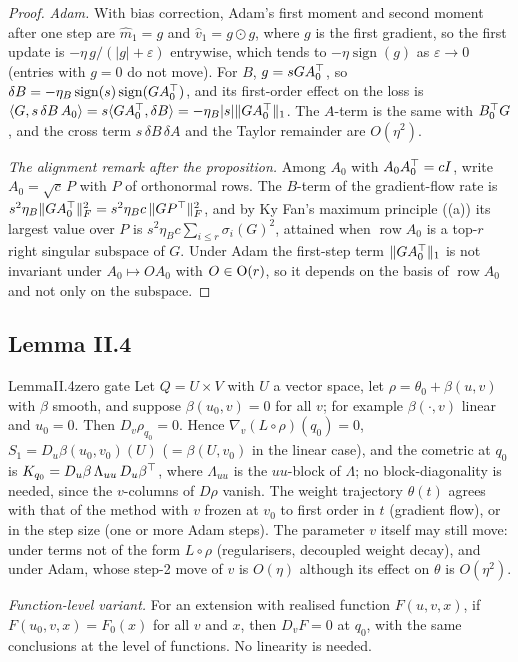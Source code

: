 \begin{proof}
\emph{Adam.} With bias correction, Adam's first moment and second moment after one step are $\hat m_1=g$ and
$\hat v_1=g\odot g$, where $g$ is the first gradient, so the first update is $-\eta\,g/(\lvert g\rvert+\varepsilon)$
entrywise, which tends to $-\eta\operatorname{sign}(g)$ as $\varepsilon\to0$ (entries with $g=0$ do not move). For $B$,
$g=sGA_0^{\top}$, so $\delta B=-\eta_B\operatorname{sign}(s)\operatorname{sign}(GA_0^{\top})$, and its first-order effect on the loss is
$\langle G,s\,\delta B\,A_0\rangle=s\langle GA_0^{\top},\delta B\rangle=-\eta_B\lvert s\rvert\|GA_0^{\top}\|_1$. The $A$-term is the same
with $B_0^{\top} G$, and the cross term $s\,\delta B\,\delta A$ and the Taylor remainder are $O(\eta^2)$.

\emph{The alignment remark after the proposition.} Among $A_0$ with $A_0A_0^{\top}=cI$, write $A_0=\sqrt c\,P$ with $P$ of
orthonormal rows. The $B$-term of the gradient-flow rate is $s^2\eta_B\|GA_0^{\top}\|_F^2=s^2\eta_Bc\,\|GP^{\top}\|_F^2$, and by Ky Fan's
maximum principle ((a)) its largest value over $P$ is $s^2\eta_Bc\sum_{i\le r}\sigma_i(G)^2$, attained when
$\operatorname{row}A_0$ is a top-$r$ right singular subspace of $G$. Under Adam the first-step term
$\|GA_0^{\top}\|_1$ is not invariant under $A_0\mapsto OA_0$ with $O\in\mathrm{O}(r)$, so it depends on the basis of
$\operatorname{row}A_0$ and not only on the subspace.
\end{proof}

\subsection{Lemma II.4}\label{proof:II.4}

\begin{restate}{Lemma}{II.4}{zero gate}
Let $Q=U\times V$ with $U$ a vector space, let $\rho=\theta_0+\beta(u,v)$ with $\beta$ smooth, and suppose
$\beta(u_0,v)=0$ for all $v$; for example $\beta(\cdot,v)$ linear and $u_0=0$. Then $D_v\rho_{q_0}=0$. Hence
$\nabla_v(L\circ\rho)(q_0)=0$, $S_1=D_u\beta(u_0,v_0)(U)$ ($=\beta(U,v_0)$ in the linear case), and the cometric at
$q_0$ is $K_{q_0}=D_u\beta\,\Lambda_{uu}\,D_u\beta^{\top}$, where $\Lambda_{uu}$ is the $uu$-block of $\Lambda$; no
block-diagonality is needed, since the $v$-columns of $D\rho$ vanish. The weight trajectory $\theta(t)$ agrees with that
of the method with $v$ frozen at $v_0$ to first order in $t$ (gradient flow), or in the step size (one or more Adam
steps). The parameter $v$ itself may still move: under terms not of the form $L\circ\rho$ (regularisers, decoupled weight
decay), and under Adam, whose step-2 move of $v$ is $O(\eta)$ although its effect on $\theta$ is $O(\eta^2)$.

\emph{Function-level variant.} For an extension with realised function $F(u,v,x)$, if $F(u_0,v,x)=F_0(x)$ for all $v$
and $x$, then $D_vF=0$ at $q_0$, with the same conclusions at the level of functions. No linearity is needed.
\end{restate}

